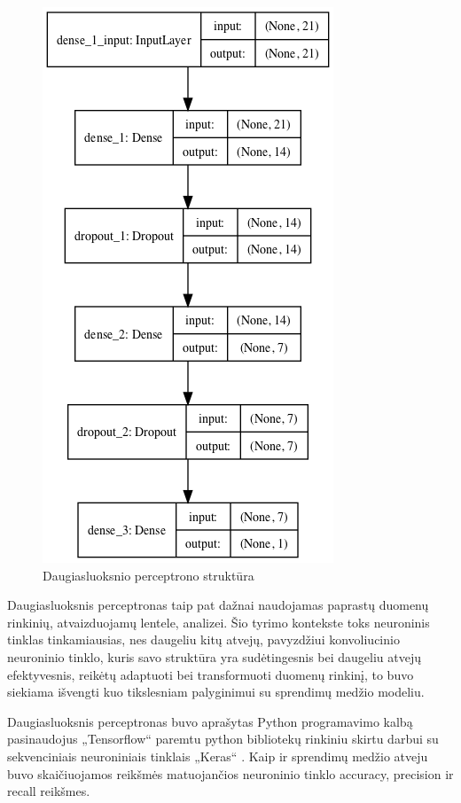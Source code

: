 \documentclass{VUMIFPSbakalaurinis}
\begin{document}
\begin{figure}[H]
    \centering
    \includegraphics[scale=0.5]{img/model}
    \caption{Daugiasluoksnio perceptrono struktūra}
    \label{img:model}
\end{figure}

Daugiasluoksnis perceptronas taip pat dažnai naudojamas paprastų duomenų rinkinių, atvaizduojamų lentele, analizei. Šio tyrimo kontekste toks neuroninis tinklas tinkamiausias, nes daugeliu kitų atvejų, pavyzdžiui konvoliucinio neuroninio tinklo, kuris savo struktūra yra sudėtingesnis bei daugeliu atvejų efektyvesnis, reikėtų adaptuoti bei transformuoti duomenų rinkinį, to buvo siekiama išvengti kuo tikslesniam palyginimui su sprendimų medžio modeliu.

Daugiasluoksnis perceptronas buvo aprašytas Python programavimo kalbą pasinaudojus „Tensorflow“ paremtu python bibliotekų rinkiniu skirtu darbui su sekvenciniais neuroniniais tinklais „Keras“ \cite{chollet2015keras}. Kaip ir sprendimų medžio atveju buvo skaičiuojamos reikšmės matuojančios neuroninio tinklo accuracy, precision ir recall reikšmes.
\end{document}
